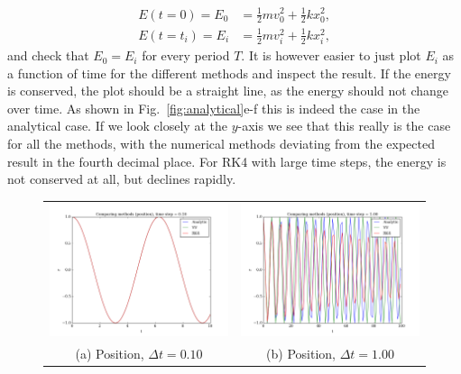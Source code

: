 \documentclass{article}
\begin{document}
\begin{multicols}{2}
\begin{equation}
	\begin{aligned}
		E(t = 0) = E_0 &= \frac{1}{2}mv_0^2 + \frac{1}{2}kx_0^2, \\
		E(t = t_i) = E_i &= \frac{1}{2}mv_i^2 + \frac{1}{2}kx_i^2,
	\end{aligned}
\end{equation}
and check that $E_0 = E_i$ for every period $T$. It is however easier to just plot $E_i$ as a function of time for the different methods and inspect the result. If the energy is conserved, the plot should be a straight line, as the energy should not change over time. As shown in Fig.~\ref{fig:analytical}e-f this is indeed the case in the analytical case. If we look closely at the $y$-axis we see that this really is the case for all the methods, with the numerical methods deviating from the expected result in the fourth decimal place. For RK4 with large time steps, the energy is not conserved at all, but declines rapidly.\\


\begin{figure}
\begin{center}
\begin{tabular}{cc}
  	\includegraphics[width=90mm]{Images/comparison_x_01.png}
	& \includegraphics[width=90mm]{Images/comparison_x_1.png} \\
	(a) Position, $\Delta t = 0.10$				& (b) Position, $\Delta t = 1.00$  \\[6pt]
	

\end{tabular}
\end{center}
\end{figure}
\end{multicols}
\end{document}

